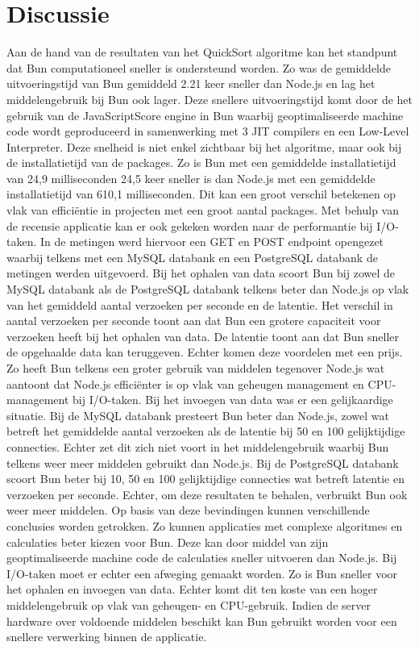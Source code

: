 \section{Discussie}
Aan de hand van de resultaten van het QuickSort algoritme kan het standpunt dat Bun computationeel sneller is ondersteund worden.
Zo was de gemiddelde uitvoeringstijd van Bun gemiddeld 2.21 keer sneller dan Node.js en lag het middelengebruik bij Bun ook lager. Deze snellere uitvoeringstijd komt door de
het gebruik van de JavaScriptScore engine in Bun waarbij geoptimaliseerde machine code wordt geproduceerd in 
samenwerking met 3 JIT compilers en een Low-Level Interpreter.
Deze snelheid is niet enkel zichtbaar bij het algoritme, maar ook bij de installatietijd van de packages.
Zo is Bun met een gemiddelde installatietijd van 24,9 milliseconden 24,5 keer sneller is dan Node.js met een 
gemiddelde installatietijd van 610,1 milliseconden. Dit kan een groot verschil betekenen op vlak van efficiëntie in projecten 
met een groot aantal packages.
Met behulp van de recensie applicatie kan er ook gekeken worden naar de performantie bij I/O-taken.
In de metingen werd hiervoor een GET en POST endpoint opengezet waarbij telkens met een MySQL databank en een PostgreSQL databank de metingen werden uitgevoerd.
Bij het ophalen van data scoort Bun bij zowel de MySQL databank als de PostgreSQL databank telkens beter dan Node.js op vlak van het gemiddeld aantal verzoeken per seconde en de latentie.
Het verschil in aantal verzoeken per seconde toont aan dat Bun een grotere capaciteit voor verzoeken heeft bij het ophalen van data.
De latentie toont aan dat Bun sneller de opgehaalde data kan teruggeven. Echter komen deze voordelen met een prijs. 
Zo heeft Bun telkens een groter gebruik van middelen tegenover Node.js wat aantoont dat Node.js efficiënter is op vlak van geheugen management en CPU-management bij I/O-taken.
Bij het invoegen van data was er een gelijkaardige situatie. 
Bij de MySQL databank presteert Bun beter dan Node.js, zowel wat betreft het gemiddelde aantal verzoeken als de latentie 
bij 50 en 100 gelijktijdige connecties.
Echter zet dit zich niet voort in het middelengebruik waarbij Bun telkens weer meer middelen gebruikt dan Node.js.
Bij de PostgreSQL databank scoort Bun beter bij 10, 50 en 100 gelijktijdige connecties wat betreft latentie en verzoeken 
per seconde. Echter, om deze resultaten te behalen, verbruikt Bun ook weer meer middelen.
Op basis van deze bevindingen kunnen verschillende conclusies worden getrokken. 
Zo kunnen applicaties met complexe algoritmes en calculaties beter kiezen voor Bun. 
Deze kan door middel van zijn geoptimaliseerde machine code de calculaties sneller uitvoeren dan Node.js.
Bij I/O-taken moet er echter een afweging gemaakt worden. Zo is Bun sneller voor het ophalen en invoegen van data.
Echter komt dit ten koste van een hoger middelengebruik op vlak van geheugen- en CPU-gebruik. 
Indien de server hardware over voldoende middelen beschikt kan Bun gebruikt worden voor een snellere verwerking binnen de applicatie.

